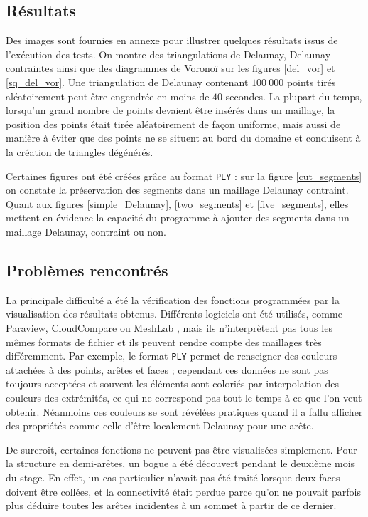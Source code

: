 \documentclass[12pt,a4paper]{report}
\begin{document}
\subsection{Résultats}

Des images sont fournies en annexe pour illustrer quelques résultats issus de l'exécution des tests. On montre des triangulations de Delaunay, Delaunay contraintes ainsi que des diagrammes de Voronoï sur les figures \ref{del_vor} et \ref{sq_del_vor}. Une triangulation de Delaunay contenant $100\ 000$ points tirés aléatoirement peut être engendrée en moins de $40$ secondes. La plupart du temps, lorsqu'un grand nombre de points devaient être insérés dans un maillage, la position des points était tirée aléatoirement de façon uniforme, mais aussi de manière à éviter que des points ne se situent au bord du domaine et conduisent à la création de triangles dégénérés.

Certaines figures ont été créées grâce au format \verb+PLY+ : sur la figure \ref{cut_segments} on constate la préservation des segments dans un maillage Delaunay contraint. Quant aux figures \ref{simple_Delaunay}, \ref{two_segments} et \ref{five_segments}, elles mettent en évidence la capacité du programme à ajouter des segments dans un maillage Delaunay, contraint ou non.

\subsection{Problèmes rencontrés}

La principale difficulté a été la vérification des fonctions programmées par la visualisation des résultats obtenus. Différents logiciels ont été utilisés, comme Paraview, CloudCompare ou MeshLab \cite{Paraview, CloudCompare, MeshLab}, mais ils n'interprètent pas tous les mêmes formats de fichier et ils peuvent rendre compte des maillages très différemment. Par exemple, le format \verb+PLY+ permet de renseigner des couleurs attachées à des points, arêtes et faces ; cependant ces données ne sont pas toujours acceptées et souvent les éléments sont coloriés par interpolation des couleurs des extrémités, ce qui ne correspond pas tout le temps à ce que l'on veut obtenir. Néanmoins ces couleurs se sont révélées pratiques quand il a fallu afficher des propriétés comme celle d'être localement Delaunay pour une arête.

De surcroît, certaines fonctions ne peuvent pas être visualisées simplement. Pour la structure en demi-arêtes, un bogue a été découvert pendant le deuxième mois du stage. En effet, un cas particulier n'avait pas été traité lorsque deux faces doivent être collées, et la connectivité était perdue parce qu'on ne pouvait parfois plus déduire toutes les arêtes incidentes à un sommet à partir de ce dernier.
\end{document}
